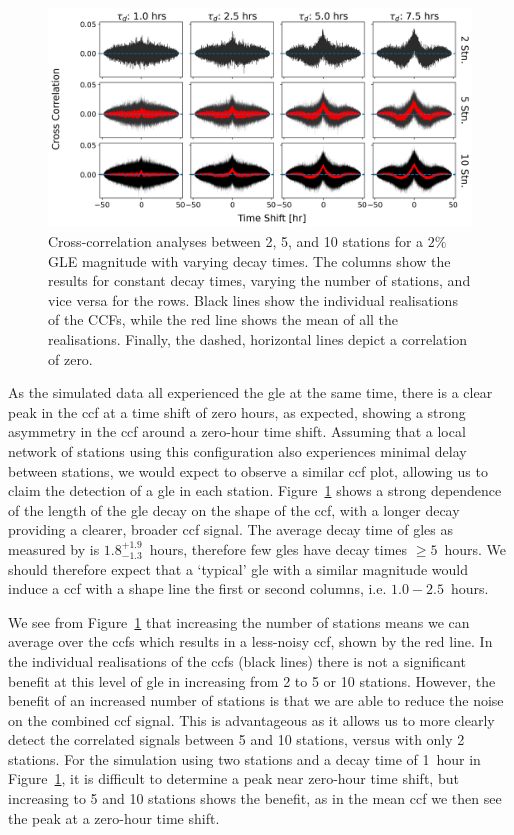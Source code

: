 \begin{figure}[ht!]
	\centering
	\includegraphics[width=\columnwidth]{HS_14008_sims_CCF_2pc_plot.png}
	\caption{Cross-correlation analyses between 2, 5, and 10 stations for a $2\%$ GLE magnitude with varying decay times. The columns show the results for constant decay times, varying the number of stations, and vice versa for the rows. Black lines show the individual realisations of the CCFs, while the red line shows the mean of all the realisations. Finally, the dashed, horizontal lines depict a correlation of zero.}
	\label{fig:HS_14008_2pc_sim_CCFs}
\end{figure}

As the simulated data all experienced the \gls{gle} at the same time, there is a clear peak in the \gls{ccf} at a time shift of zero hours, as expected, showing a strong asymmetry in the \gls{ccf} around a zero-hour time shift. Assuming that a local network of stations using this configuration also experiences minimal delay between stations, we would expect to observe a similar \gls{ccf} plot, allowing us to claim the detection of a \gls{gle} in each station. Figure~\ref{fig:HS_14008_2pc_sim_CCFs} shows a strong dependence of the length of the \gls{gle} decay on the shape of the \gls{ccf}, with a longer decay providing a clearer, broader \gls{ccf} signal. The average decay time of \glspl{gle} as measured by \citet{strauss_pulse_2017} is $1.8^{+1.9}_{-1.3}$~hours, therefore few \glspl{gle} have decay times $\geq 5$~hours. We should therefore expect that a `typical' \gls{gle} with a similar magnitude would induce a \gls{ccf} with a shape line the first or second columns, i.e. $1.0-2.5$~hours. 

We see from Figure~\ref{fig:HS_14008_2pc_sim_CCFs} that increasing the number of stations means we can average over the \glspl{ccf} which results in a less-noisy \gls{ccf}, shown by the red line. In the individual realisations of the \glspl{ccf} (black lines) there is not a significant benefit at this level of \gls{gle} in increasing from 2 to 5 or 10 stations. However, the benefit of an increased number of stations is that we are able to reduce the noise on the combined \gls{ccf} signal. This is advantageous as it allows us to more clearly detect the correlated signals between 5 and 10 stations, versus with only 2 stations. For the simulation using two stations and a decay time of 1~hour in Figure~\ref{fig:HS_14008_2pc_sim_CCFs}, it is difficult to determine a peak near zero-hour time shift, but increasing to 5 and 10 stations shows the benefit, as in the mean \gls{ccf} we then see the peak at a zero-hour time shift. 


